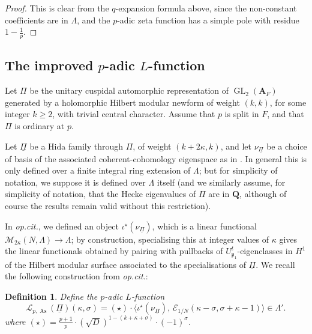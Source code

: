 \documentclass[a4paper,10pt]{amsart}
\theoremstyle{plain}
\newtheorem{definition}[theorem]{Definition}
\theoremstyle{remark}
\DeclareMathOperator{\GL}{GL}
\DeclareMathOperator{\As}{As}
\renewcommand{\AA}{\mathbf{A}}
\newcommand{\QQ}{\mathbf{Q}}
\newcommand{\cE}{\mathcal{E}}
\newcommand{\cL}{\mathcal{L}}
\newcommand{\cM}{\mathcal{M}}
\newcommand{\uPi}{\underline{\Pi}}
\newcommand{\pp}{\mathfrak{p}}
\numberwithin{equation}{section}
\renewcommand{\ge}{\geqslant}
\begin{document}
  \begin{proof}
   This is clear from the $q$-expansion formula above, since the non-constant coefficients are in $\Lambda$, and the $p$-adic zeta function has a simple pole with residue $1 - \tfrac{1}{p}$.
  \end{proof}


 \subsection{The improved $p$-adic $L$-function}

  Let $\Pi$ be the unitary cuspidal automorphic representation of $\GL_2(\AA_F)$ generated by a holomorphic Hilbert modular newform of weight $(k, k)$, for some integer $k \ge 2$, with trivial central character. Assume that $p$ is split in $F$, and that $\Pi$ is ordinary at $p$.

   Let $\underline{\Pi}$ be a Hida family through $\Pi$, of weight $(k + 2\kappa, k)$, and let $\nu_{\underline{\Pi}}$ be a choice of basis of the associated coherent-cohomology eigenspace as in \cite[\S 7.4]{grossiloefflerzerbesLfunct}. In general this is only defined over a finite integral ring extension of $\Lambda$; but for simplicity of notation, we suppose it is defined over $\Lambda$ itself (and we similarly assume, for simplicity of notation, that the Hecke eigenvalues of $\Pi$ are in $\QQ$, although of course the results remain valid without this restriction).

   In \emph{op.cit.}, we defined an object $\iota^\star\left(\nu_{\underline{\Pi}}\right)$, which is a linear functional $\cM_{2\kappa}(N, \Lambda) \to \Lambda$; by construction, specialising this at integer values of $\kappa$ gives the linear functionals obtained by pairing with pullbacks of $U_{\pp_1}^{t}$-eigenclasses in $H^1$ of the Hilbert modular surface associated to the specialisations of $\uPi$. We recall the following construction from \emph{op.cit.}:

  \begin{definition}
   Define the $p$-adic $L$-function
   \[
    \cL_{p,\As}(\uPi)(\kappa, \sigma) = (\star) \cdot
    \Big\langle \iota^\star\left(\nu_{\underline{\Pi}}\right),\,
    \cE_{1/N}(\kappa - \sigma, \sigma + \kappa - 1)
    \Big\rangle \in \Lambda'.
   \]
   where $(\star) = \tfrac{p + 1}{p} \cdot (\sqrt{D})^{1 - (k + \kappa + \sigma)} \cdot (-1)^\sigma$.
  \end{definition}
\end{document}
